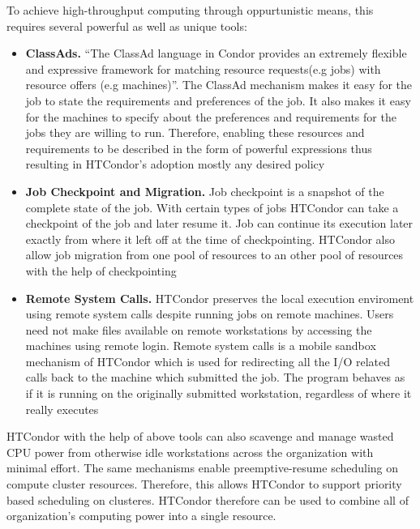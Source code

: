 \documentclass[9pt,twocolumn,twoside]{../../styles/osajnl}
\begin{document}
To achieve high-throughput computing through oppurtunistic means, this
requires several powerful as well as unique tools:

\begin{itemize}

\item {\bf ClassAds.} ``The ClassAd language in Condor provides an
  extremely flexible and expressive framework for matching resource
  requests(e.g jobs) with resource offers (e.g
  machines)''\cite{condor-practice}.  The ClassAd mechanism makes it
  easy for the job to state the requirements and preferences of the
  job. It also makes it easy for the machines to specify about the
  preferences and requirements for the jobs they are willing to run.
  Therefore, enabling these resources and requirements to be described
  in the form of powerful expressions thus resulting in HTCondor's
  adoption mostly any desired policy\cite{condor-practice}
  
\item {\bf Job Checkpoint and Migration.} Job checkpoint is a snapshot
  of the complete state of the
  job\cite{Checkpoint_Migration_techreport_1997}. With certain types
  of jobs HTCondor can take a checkpoint of the job and later resume
  it. Job can continue its execution later exactly from where it left
  off at the time of checkpointing. HTCondor also allow job migration
  from one pool of resources to an other pool of resources with the
  help of checkpointing\cite{beowulfbook-condor}

\item {\bf Remote System Calls.} HTCondor preserves the local
  execution enviroment using remote system calls despite running jobs
  on remote machines. Users need not make files available on remote
  workstations by accessing the machines using remote login. Remote
  system calls is a mobile sandbox mechanism of HTCondor which is used
  for redirecting all the I/O related calls back to the machine which
  submitted the job. The program behaves as if it is running on the
  originally submitted workstation, regardless of where it really
  executes\cite{condor-practice}
  
\end{itemize}

HTCondor with the help of above tools can also scavenge and manage
wasted CPU power from otherwise idle workstations across the
organization with minimal effort\cite{condor-hunter}. The same
mechanisms enable preemptive-resume scheduling on compute cluster
resources. Therefore, this allows HTCondor to support priority based
scheduling on clusteres. HTCondor therefore can be used to combine all
of organization's computing power into a single resource.
\end{document}
